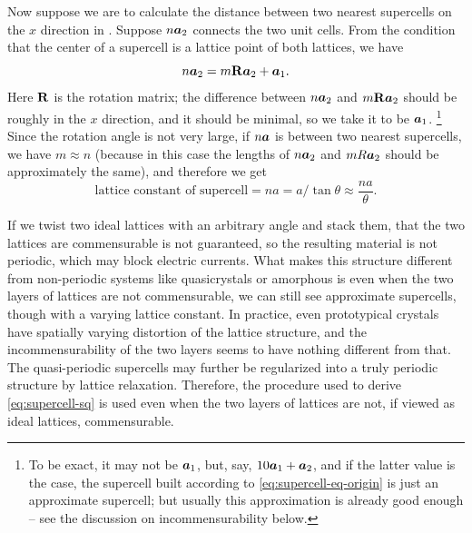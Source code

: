 \documentclass[hyperref, a4paper]{article}
\begin{document}
Now suppose we are to calculate the distance between two nearest supercells 
on the $x$ direction in .
Suppose $n \vb*{a}_2$ connects the two unit cells.
From the condition that the center of a supercell is 
a lattice point of both lattices, 
we have
\begin{equation}
    n \vb*{a}_2 = m \vb{R} \vb*{a}_2 + \vb*{a}_1.
    \label{eq:supercell-eq-origin}
\end{equation}
Here $\vb{R}$ is the rotation matrix;
the difference between $n \vb*{a}_2$ and $m \vb{R} \vb*{a}_2$ 
should be roughly in the $x$ direction, 
and it should be minimal, so we take it to be $\vb*{a}_1$.%
\footnote{
    To be exact, it may not be $\vb*{a}_1$, but, say, $10 \vb*{a}_1 + \vb*{a}_2$,
    and if the latter value is the case,
    the supercell built according to \eqref{eq:supercell-eq-origin} is just an approximate supercell; 
    but usually this approximation is already good enough -- 
    see the discussion on incommensurability below.
}
Since the rotation angle is not very large,
if $n \vb*{a}$ is between two nearest supercells, 
we have $m \approx n$
(because in this case the lengths of $n \vb*{a}_2$ and $m R \vb*{a}_2$ should be approximately the same),
and therefore we get 
\begin{equation}
    \text{lattice constant of supercell} = n a = a / \tan \theta \approx \frac{na}{\theta}.
    \label{eq:supercell-sq}
\end{equation}

If we twist two ideal lattices with an arbitrary angle and stack them,
that the two lattices are commensurable is not guaranteed,
so the resulting material is not periodic,
which may block electric currents.
What makes this structure different from non-periodic systems like quasicrystals or amorphous is 
even when the two layers of lattices are not commensurable,
we can still see approximate supercells,
though with a varying lattice constant.
In practice, even prototypical crystals have spatially varying distortion of the lattice structure,
and the incommensurability of the two layers seems to have nothing different from that.
The quasi-periodic supercells may further be regularized into a truly periodic structure by lattice relaxation.
Therefore, the procedure used to derive \eqref{eq:supercell-sq} is used
even when the two layers of lattices are not, if viewed as ideal lattices, commensurable.
\end{document}

